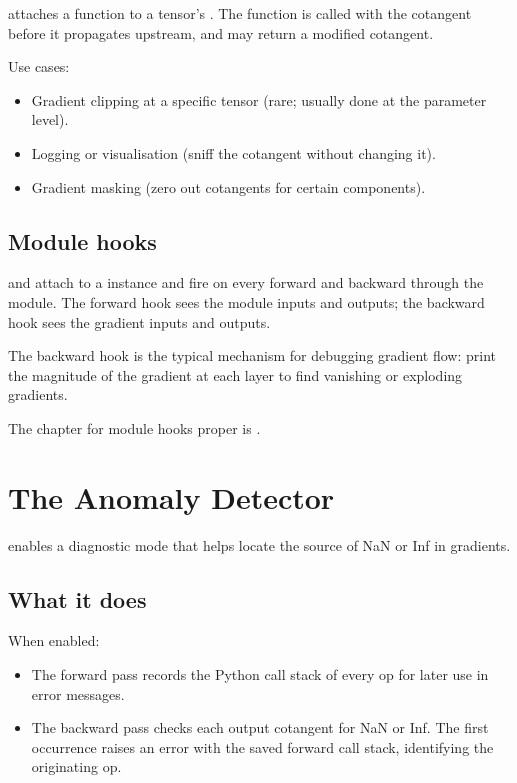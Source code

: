  attaches a function to a tensor's
. The function is called with the cotangent before
it propagates upstream, and may return a modified cotangent.

Use cases:
\begin{itemize}
  \item Gradient clipping at a specific tensor (rare; usually
    done at the parameter level).
  \item Logging or visualisation (sniff the cotangent without
    changing it).
  \item Gradient masking (zero out cotangents for certain
    components).
\end{itemize}

\subsection{Module hooks}
\label{ssec:autograd_engine:module_hooks}

 and
 attach to a 
instance and fire on every forward and backward through the
module. The forward hook sees the module inputs and outputs; the
backward hook sees the gradient inputs and outputs.

The backward hook is the typical mechanism for debugging
gradient flow: print the magnitude of the gradient at each
layer to find vanishing or exploding gradients.

The chapter for module hooks proper is
.

\section{The Anomaly Detector}
\label{sec:autograd_engine:anomaly}

 enables a
diagnostic mode that helps locate the source of NaN or Inf in
gradients.

\subsection{What it does}
\label{ssec:autograd_engine:anomaly_does}

When enabled:
\begin{itemize}
  \item The forward pass records the Python call stack of every
    op for later use in error messages.
  \item The backward pass checks each output cotangent for NaN
    or Inf. The first occurrence raises an error with the saved
    forward call stack, identifying the originating op.
\end{itemize}


